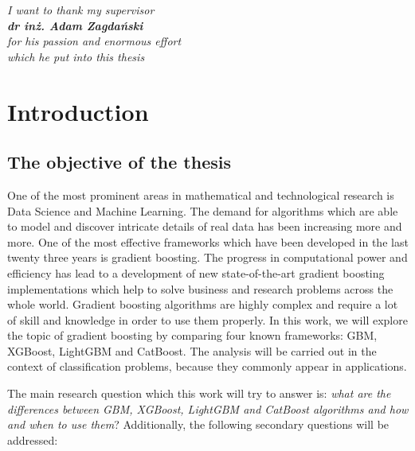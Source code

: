 \documentclass[magisterska, english]{pwr_wmat_praca_dyplomowa}
\theoremstyle{plain}
\numberwithin{theorem}{chapter}
\theoremstyle{definition}
\numberwithin{theorem}{chapter}
\begin{document}
\frontmatter
\maketitle
\mainmatter
\thispagestyle{empty}
\begin{flushright}
  \null\vfill
  \Large
  \textit{
  I want to thank my supervisor\\\textbf{dr inż. Adam Zagdański}\\for his passion and enormous effort\\which he put into this thesis}\\
  \vspace{-1cm}
\end{flushright}

\tableofcontents

\chapter{Introduction}\label{chapter:intro}
\section{The objective of the thesis}
One of the most prominent areas in mathematical and technological research is Data Science and Machine Learning. The demand for algorithms which are able to model and discover intricate details of real data has been increasing more and more. One of the most effective frameworks which have been developed in the last twenty three years is gradient boosting. The progress in computational power and efficiency has lead to a development of new state-of-the-art gradient boosting implementations which help to solve business and research problems across the whole world. Gradient boosting algorithms are highly complex and require a lot of skill and knowledge in order to use them properly. In this work, we will explore the topic of gradient boosting by comparing four known frameworks: GBM, XGBoost, LightGBM and CatBoost. The analysis will be carried out in the context of classification problems, because they commonly appear in applications.

The main research question which this work will try to answer is: \emph{what are the differences between GBM, XGBoost, LightGBM and CatBoost algorithms and how and when to use them}? Additionally, the following secondary questions will be addressed:
\end{document}
